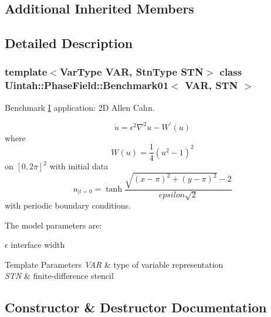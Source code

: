 \subsection*{Additional Inherited Members}


\subsection{Detailed Description}
\subsubsection*{template$<$Var\+Type V\+AR, Stn\+Type S\+TN$>$\newline
class Uintah\+::\+Phase\+Field\+::\+Benchmark01$<$ V\+A\+R, S\+T\+N $>$}

Benchmark \hyperlink{structUintah_1_1PhaseField_1_1I}{I} application\+: 2D Allen Cahn. 

\[ \dot u = \epsilon^2 \nabla^2 u - W^\prime(u) \] where \[ W (u) = \frac{1}{4} (u^2 − 1)^2 \] on $[0, 2\pi]^2$ with initial data \[ u_{|t=0} = \tanh \frac{\sqrt{(x-\pi)^2+(y-\pi)^2}-2}{epsilon\sqrt{2}} \] with periodic boundary conditions.

The model parameters are\+:
\begin{DoxyItemize}
\item $ \epsilon $ interface width
\end{DoxyItemize}


\begin{DoxyTemplParams}{Template Parameters}
{\em V\+AR} & type of variable representation \\
\hline
{\em S\+TN} & finite-\/difference stencil \\
\hline
\end{DoxyTemplParams}


\subsection{Constructor \& Destructor Documentation}
\mbox{\label{classUintah_1_1PhaseField_1_1Benchmark01_a1081aa4dc4f203dda68637071b5a86b1}} 
